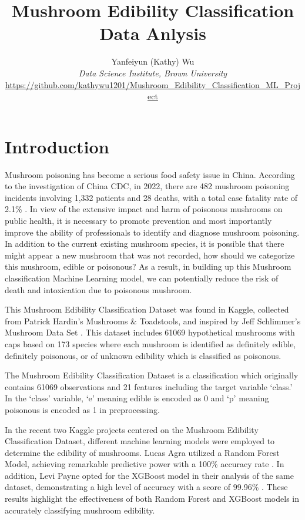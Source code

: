 \documentclass{article}
\title{Mushroom Edibility Classification Data Anlysis}
\author{Yanfeiyun (Kathy) Wu\\
\textit{\small Data Science Institute, Brown University}\\
\href{https://github.com/kathywu1201/Mushroom_Edibility_Classification_ML_Project}{\small https://github.com/kathywu1201/Mushroom\_Edibility\_Classification\_ML\_Project}}
\begin{document}
\maketitle

\section{Introduction}

\hspace{0.5cm} Mushroom poisoning has become a serious food safety issue in China. According to the investigation of China CDC, in 2022, there are 482 mushroom poisoning incidents involving 1,332 patients and 28 deaths, with a total case fatality rate of 2.1\% \cite{Li et al.}. In view of the extensive impact and harm of poisonous mushrooms on public health, it is necessary to promote prevention and most importantly improve the ability of professionals to identify and diagnose mushroom poisoning. In addition to the current existing mushroom species, it is possible that there might appear a new mushroom that was not recorded, how should we categorize this mushroom, edible or poisonous? As a result, in building up this Mushroom classification Machine Learning model, we can potentially reduce the risk of death and intoxication due to poisonous mushroom.

This Mushroom Edibility Classification Dataset \cite{Zohaib} was found in Kaggle, collected from Patrick Hardin’s Mushrooms \& Toadstools, and inspired by Jeff Schlimmer’s Mushroom Data Set . This dataset includes 61069 hypothetical mushrooms with caps based on 173 species where each mushroom is identified as definitely edible, definitely poisonous, or of unknown edibility which is classified as poisonous.

The Mushroom Edibility Classification Dataset is a classification which originally contains 61069 observations and 21 features including the target variable ‘class.’ In the ‘class’ variable, ‘e’ meaning edible is encoded as 0 and ‘p’ meaning poisonous is encoded as 1 in preprocessing. 

In the recent two Kaggle projects centered on the Mushroom Edibility Classification Dataset, different machine learning models were employed to determine the edibility of mushrooms. Lucas Agra utilized a Random Forest Model, achieving remarkable predictive power with a 100\% accuracy rate \cite{Agra}. In addition, Levi Payne opted for the XGBoost model in their analysis of the same dataset, demonstrating a high level of accuracy with a score of 99.96\% \cite{Payne}. These results highlight the effectiveness of both Random Forest and XGBoost models in accurately classifying mushroom edibility.
\end{document}
